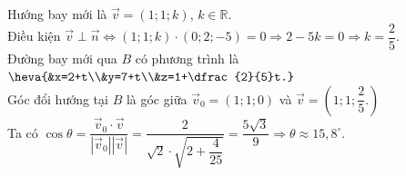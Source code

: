 \begin{bt}
{		Hướng bay mới là $\overrightarrow{v}=(1;1;k)$,  $k\in \mathbb{R}$.\\
		Điều kiện $\overrightarrow{v} \perp \overrightarrow{n}\Leftrightarrow (1;1;k)\cdot(0;2;-5)=0 \Rightarrow 2-5 k=0 \Rightarrow k=\dfrac{2}{5}$.\\ 
		Đường bay mới qua $B$ có  phương trình là $\heva{&x=2+t\\&y=7+t\\&z=1+\dfrac{2}{5}t.}$\\
		Góc đổi hướng tại $B$ là  góc giữa $\overrightarrow{v}_{0}=(1; 1; 0)$ và $\overrightarrow{v}=\left(1; 1; \dfrac{2}{5}.\right)$\\
		Ta có 
		$\cos \theta=\dfrac{\overrightarrow{v}_{0} \cdot \overrightarrow{v}}{\left|\overrightarrow{v}_{0}\right||\overrightarrow{v}|}=\dfrac{2}{\sqrt{2}\cdot\sqrt{2+\dfrac{4}{25}}}=\dfrac{5\sqrt{3}}{9} \Rightarrow \theta \approx 15,8^{\circ}$. 
	} 
\end{bt}

